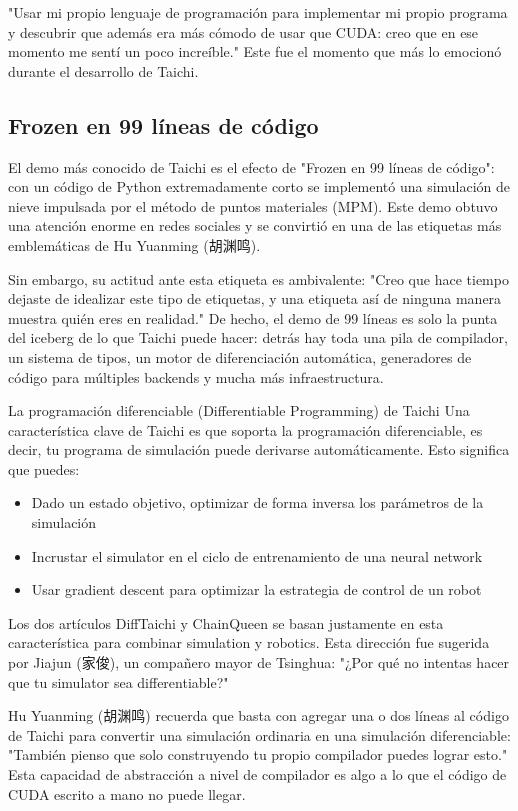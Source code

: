 "Usar mi propio lenguaje de programación para implementar mi propio programa y descubrir que además era más cómodo de usar que CUDA: creo que en ese momento me sentí un poco increíble." Este fue el momento que más lo emocionó durante el desarrollo de Taichi.

\subsection{Frozen en 99 líneas de código}

El demo más conocido de Taichi es el efecto de "Frozen en 99 líneas de código": con un código de Python extremadamente corto se implementó una simulación de nieve impulsada por el método de puntos materiales (MPM). Este demo obtuvo una atención enorme en redes sociales y se convirtió en una de las etiquetas más emblemáticas de Hu Yuanming (胡渊鸣).

Sin embargo, su actitud ante esta etiqueta es ambivalente: "Creo que hace tiempo dejaste de idealizar este tipo de etiquetas, y una etiqueta así de ninguna manera muestra quién eres en realidad." De hecho, el demo de 99 líneas es solo la punta del iceberg de lo que Taichi puede hacer: detrás hay toda una pila de compilador, un sistema de tipos, un motor de diferenciación automática, generadores de código para múltiples backends y mucha más infraestructura.

\begin{knowledgebox}{La programación diferenciable (Differentiable Programming) de Taichi}
Una característica clave de Taichi es que soporta la programación diferenciable, es decir, tu programa de simulación puede derivarse automáticamente. Esto significa que puedes:
\begin{itemize}
\item Dado un estado objetivo, optimizar de forma inversa los parámetros de la simulación
\item Incrustar el simulator en el ciclo de entrenamiento de una neural network
\item Usar gradient descent para optimizar la estrategia de control de un robot
\end{itemize}
Los dos artículos DiffTaichi y ChainQueen se basan justamente en esta característica para combinar simulation y robotics. Esta dirección fue sugerida por Jiajun (家俊), un compañero mayor de Tsinghua: "¿Por qué no intentas hacer que tu simulator sea differentiable?"
\end{knowledgebox}

Hu Yuanming (胡渊鸣) recuerda que basta con agregar una o dos líneas al código de Taichi para convertir una simulación ordinaria en una simulación diferenciable: "También pienso que solo construyendo tu propio compilador puedes lograr esto." Esta capacidad de abstracción a nivel de compilador es algo a lo que el código de CUDA escrito a mano no puede llegar.

